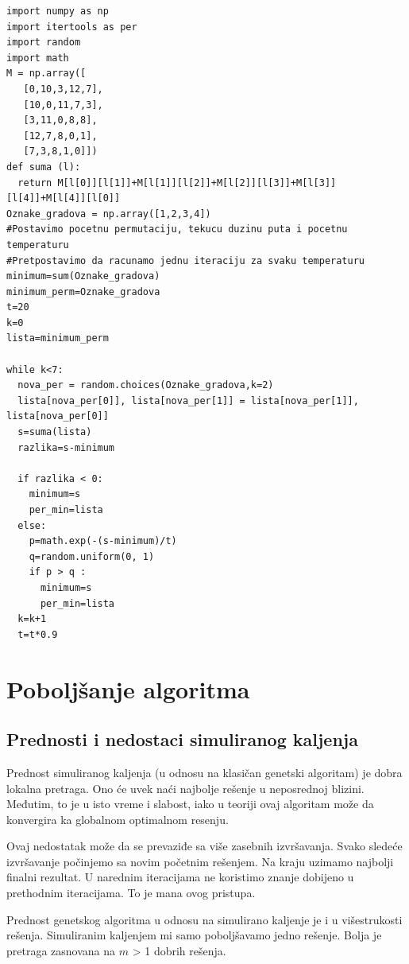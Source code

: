 \documentclass[a4paper]{article}
\begin{document}
\begin{lstlisting}[caption={Rešavanje problema TSP korišćenjem SA algoritma},frame=single, label=simple]
import numpy as np
import itertools as per
import random
import math 
M = np.array([
   [0,10,3,12,7],
   [10,0,11,7,3],
   [3,11,0,8,8],
   [12,7,8,0,1],
   [7,3,8,1,0]])
def suma (l):
  return M[l[0]][l[1]]+M[l[1]][l[2]]+M[l[2]][l[3]]+M[l[3]][l[4]]+M[l[4]][l[0]]
Oznake_gradova = np.array([1,2,3,4])
#Postavimo pocetnu permutaciju, tekucu duzinu puta i pocetnu temperaturu
#Pretpostavimo da racunamo jednu iteraciju za svaku temperaturu
minimum=sum(Oznake_gradova)
minimum_perm=Oznake_gradova
t=20
k=0
lista=minimum_perm

while k<7:
  nova_per = random.choices(Oznake_gradova,k=2)
  lista[nova_per[0]], lista[nova_per[1]] = lista[nova_per[1]], lista[nova_per[0]]
  s=suma(lista)
  razlika=s-minimum
  
  if razlika < 0:
    minimum=s
    per_min=lista
  else:
    p=math.exp(-(s-minimum)/t)
    q=random.uniform(0, 1)
    if p > q :
      minimum=s
      per_min=lista
  k=k+1
  t=t*0.9
\end{lstlisting}






\section{Poboljšanje algoritma}

\subsection{Prednosti i nedostaci simuliranog kaljenja}
Prednost simuliranog kaljenja (u odnosu na klasičan genetski algoritam) je dobra lokalna pretraga.\cite{ga_vs_sa_tech_report, gannealingthesis} Ono će uvek naći najbolje rešenje u neposrednoj blizini. Međutim, to je u isto vreme i slabost, iako u teoriji ovaj algoritam može da konvergira ka globalnom optimalnom resenju.\cite{gannealingthesis} \par
Ovaj nedostatak može da se prevaziđe sa više zasebnih izvršavanja. Svako sledeće izvršavanje počinjemo sa novim početnim rešenjem. Na kraju uzimamo najbolji finalni rezultat. U narednim iteracijama ne koristimo znanje dobijeno u prethodnim iteracijama. To je mana ovog pristupa. \par
Prednost genetskog algoritma u odnosu na simulirano kaljenje je i u višestrukosti rešenja.\cite{gannealingthesis} Simuliranim kaljenjem mi samo poboljšavamo jedno rešenje. Bolja je pretraga zasnovana na $m$ > 1 dobrih rešenja.
\end{document}
